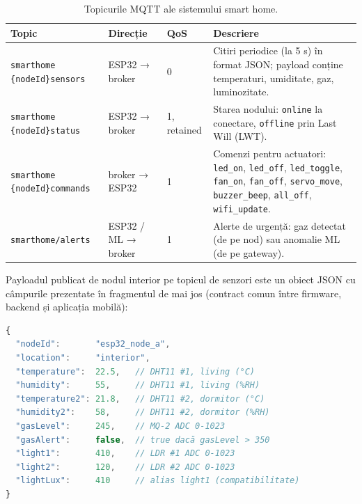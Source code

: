 \begin{table}[H]
  \centering
  \caption{Topicurile MQTT ale sistemului smart home.}
  \label{tab:mqtt-topics}
  \small
  \begin{tabular}{@{}p{4.4cm} p{2.4cm} p{1.5cm} p{4.6cm}@{}}
    \toprule
    \textbf{Topic} & \textbf{Direcție} & \textbf{QoS} & \textbf{Descriere} \\
    \midrule
    \texttt{smarthome\slb{} \{nodeId\}\slb{}sensors}
      & ESP32 → broker
      & 0
      & Citiri periodice (la 5 s) în format JSON; payload conține
        temperaturi, umiditate, gaz, luminozitate. \\
    \addlinespace
    \texttt{smarthome\slb{} \{nodeId\}\slb{}status}
      & ESP32 → broker
      & 1, retained
      & Starea nodului: \texttt{online} la conectare,
        \texttt{offline} prin Last Will (LWT). \\
    \addlinespace
    \texttt{smarthome\slb{} \{nodeId\}\slb{}commands}
      & broker → ESP32
      & 1
      & Comenzi pentru actuatori: \texttt{led\_on}, \texttt{led\_off},
        \texttt{led\_toggle}, \texttt{fan\_on}, \texttt{fan\_off},
        \texttt{servo\_move}, \texttt{buzzer\_beep}, \texttt{all\_off},
        \texttt{wifi\_update}. \\
    \addlinespace
    \texttt{smarthome/alerts}
      & ESP32 / ML → broker
      & 1
      & Alerte de urgență: gaz detectat (de pe nod) sau anomalie ML
        (de pe gateway). \\
    \bottomrule
  \end{tabular}
\end{table}

Payloadul publicat de nodul interior pe topicul de senzori este un obiect JSON
cu câmpurile prezentate în fragmentul de mai jos (contract comun între firmware,
backend și aplicația mobilă):

\begin{lstlisting}[language=TypeScript, caption={Payload MQTT publicat de nodul interior la fiecare 5 secunde.}]
{
  "nodeId":       "esp32_node_a",
  "location":     "interior",
  "temperature":  22.5,   // DHT11 #1, living (°C)
  "humidity":     55,     // DHT11 #1, living (%RH)
  "temperature2": 21.8,   // DHT11 #2, dormitor (°C)
  "humidity2":    58,     // DHT11 #2, dormitor (%RH)
  "gasLevel":     245,    // MQ-2 ADC 0-1023
  "gasAlert":     false,  // true dacă gasLevel > 350
  "light1":       410,    // LDR #1 ADC 0-1023
  "light2":       120,    // LDR #2 ADC 0-1023
  "lightLux":     410     // alias light1 (compatibilitate)
}
\end{lstlisting}

